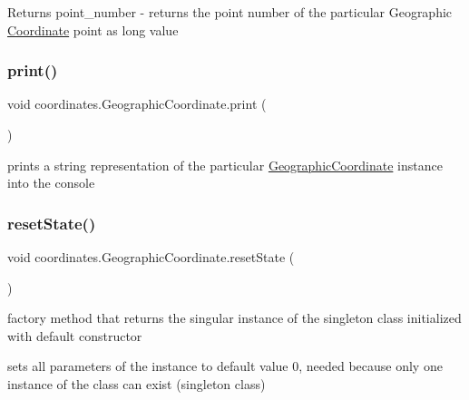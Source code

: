 \begin{DoxyReturn}{Returns}
point\+\_\+number -\/ returns the point number of the particular Geographic \hyperlink{classcoordinates_1_1_coordinate}{Coordinate} point as long value 
\end{DoxyReturn}
\mbox{\label{classcoordinates_1_1_geographic_coordinate_a1cbf537f61d51979a831b2f018d28897}} 
\subsubsection{\texorpdfstring{print()}{print()}}
{\footnotesize\ttfamily void coordinates.\+Geographic\+Coordinate.\+print (\begin{DoxyParamCaption}{ }\end{DoxyParamCaption})}



prints a string representation of the particular \hyperlink{classcoordinates_1_1_geographic_coordinate}{Geographic\+Coordinate} instance into the console 

\mbox{\label{classcoordinates_1_1_geographic_coordinate_ae489c187a21fc058b5af3d7d7ff1e5e7}} 
\subsubsection{\texorpdfstring{reset\+State()}{resetState()}}
{\footnotesize\ttfamily void coordinates.\+Geographic\+Coordinate.\+reset\+State (\begin{DoxyParamCaption}{ }\end{DoxyParamCaption})\hspace{0.3cm}{\ttfamily [private]}}



factory method that returns the singular instance of the singleton class initialized with default constructor 

sets all parameters of the instance to default value 0, needed because only one instance of the class can exist (singleton class) \mbox{\label{classcoordinates_1_1_geographic_coordinate_a1c76ad1e5e1cd8c9ff738d3cdf1c4d0a}} 
